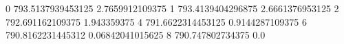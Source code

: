 0 793.5137939453125 2.7659912109375
1 793.4139404296875 2.6661376953125
2 792.691162109375 1.943359375
4 791.6622314453125 0.9144287109375
6 790.8162231445312 0.06842041015625
8 790.747802734375 0.0
